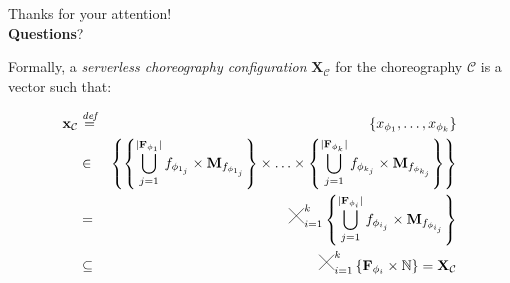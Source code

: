 \documentclass[13.5pt]{beamer}
\newcommand{\B}[1]{\textcolor{TorVergataColor}{\textbf{#1}}}
\newcommand{\Cross}{\mathbin{\tikz [x=2.5ex,y=2.5ex,line width=.10ex] \draw (0,0) -- (1,1) (0,1) -- (1,0);}}
\newcommand{\mathDef}{\overset{\textit{def}}{=}}
\begin{document}
\begin{frame}{{}}
	\begin{block}{}
		\centering
		Thanks for your attention!\\\B{Questions}?
	\end{block}
\end{frame} 



\begin{frame}
	Formally, a \textit{serverless choreography configuration} $\textbf{X}_{\mathcal{C}}$ for the choreography $\mathcal{C}$ is a vector such that:
	
	\begin{eqnarray}
		\textbf{x}_{\mathcal{C}} & \mathDef & \left\lbrace x_{\phi_{1}}, \ldots, x_{\phi_{k}} \right\rbrace \nonumber \\ 
		& \in & \left\{  \left\{ \bigcup_{j=1}^{|\textbf{F}_{\phi_{1}}|} f_{\phi_{1_j}} \times \textbf{M}_{f_{\phi_{1_j}}} \right\} \times \ldots \times \left\{ \bigcup_{j=1}^{|\textbf{F}_{\phi_{k}}|} f_{\phi_{k_j}} \times \textbf{M}_{f_{\phi_{k_j}}} \right\} \right\}  \nonumber \\
		& = & \Cross_{i = 1}^k \left\{ \bigcup_{j=1}^{|\textbf{F}_{\phi_{i}}|} f_{\phi_{i_j}} \times \textbf{M}_{f_{\phi_{i_j}}} \right\} \nonumber \\
		& \subseteq & \Cross_{i = 1}^k \left\{ \textbf{F}_{\phi_{i}} \times \mathbb{N} \right\} = \textbf{X}_{\mathcal{C}}
	\end{eqnarray}
\end{frame}
\end{document}
